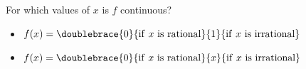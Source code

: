 For which values of $x$ is $f$ continuous?
\begin{itemize}
\item $f(x)=\doublebrace{0}{\mathrm{if~} x\mathrm{~is~rational}}{1}{\mathrm{if~}x~\mathrm{is~irrational}}$
\item $f(x)=\doublebrace{0}{\mathrm{if~} x\mathrm{~is~rational}}{x}{\mathrm{if~}x~\mathrm{is~irrational}}$
\end{itemize}